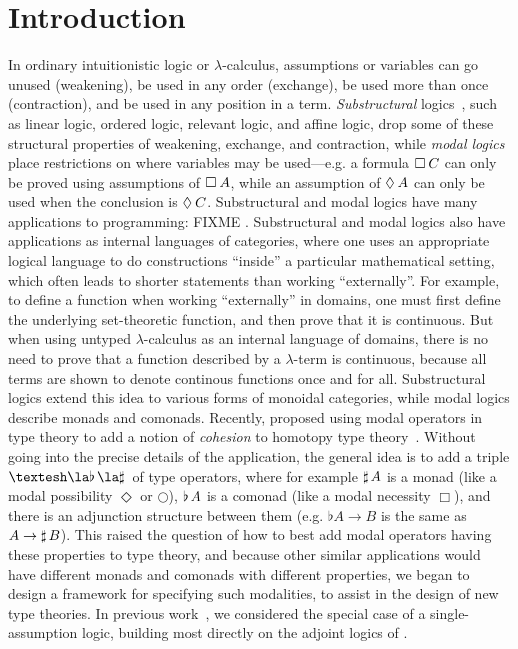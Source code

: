 
\section{Introduction}

In ordinary intuitionistic logic or $\lambda$-calculus, assumptions or
variables can go unused (weakening), be used in any order (exchange), be
used more than once (contraction), and be used in any position in a
term.  \emph{Substructural} logics~\citep{?}, such as linear logic,
ordered logic, relevant logic, and affine logic, drop some of these
structural properties of weakening, exchange, and contraction, while
\emph{modal logics}~\citep{?} place restrictions on where variables may
be used---e.g. a formula $\Box_{} \, {C}$ can only be proved using assumptions
of $\Box_{} \, {A}$, while an assumption of $\Diamond_{} \, {A}$ can only be used when
the conclusion is $\Diamond_{} \, {C}$.  Substructural and modal logics have many
applications to programming: FIXME \citep{?}.  Substructural and modal
logics also have applications as internal languages of categories, where
one uses an appropriate logical language to do constructions ``inside''
a particular mathematical setting, which often leads to shorter
statements than working ``externally''.  For example, to define a
function when working ``externally'' in domains, one must first define
the underlying set-theoretic function, and then prove that it is
continuous.  But when using untyped $\lambda$-calculus as an internal
language of domains, there is no need to prove that a function described
by a $\lambda$-term is continuous, because all terms are shown to denote
continous functions once and for all.  Substructural logics extend this
idea to various forms of monoidal categories, while modal logics
describe monads and comonads.  Recently,
\citet{schreibershulman12cohesive,shulman15realcohesion} proposed using
modal operators in type theory to add a notion of \emph{cohesion} to
homotopy type theory~\citep{uf13hott-book,voevodsky06homotopy}.  Without
going into the precise details of the application, the general idea is
to add a triple $\sh{} \la \Flat{} \la \Sharp{}$ of type operators,
where for example $\sharp \, {A}$ is a monad (like a modal possibility
$\Diamond$ or $\bigcirc$), $\flat \, {A}$ is a comonad (like a modal
necessity $\Box$), and there is an adjunction structure between them
(e.g. $\flat{A} \to B$ is the same as $A \to \sharp \, {B}$).  This raised
the question of how to best add modal operators having these properties
to type theory, and because other similar applications would have
different monads and comonads with different properties, we began to
design a framework for specifying such modalities, to assist in the
design of new type theories.  In previous work~\citep{ls16adjoint}, we
considered the special case of a single-assumption logic, building most
directly on the adjoint logics of
\citet{bentonwadler96adjoint,reed09adjoint}.

